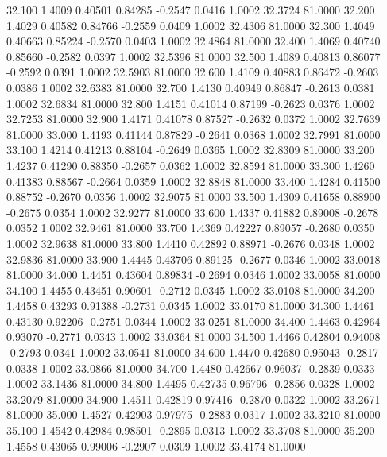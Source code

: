   32.100   1.4009   0.40501   0.84285  -0.2547   0.0416   1.0002  32.3724  81.0000
  32.200   1.4029   0.40582   0.84766  -0.2559   0.0409   1.0002  32.4306  81.0000
  32.300   1.4049   0.40663   0.85224  -0.2570   0.0403   1.0002  32.4864  81.0000
  32.400   1.4069   0.40740   0.85660  -0.2582   0.0397   1.0002  32.5396  81.0000
  32.500   1.4089   0.40813   0.86077  -0.2592   0.0391   1.0002  32.5903  81.0000
  32.600   1.4109   0.40883   0.86472  -0.2603   0.0386   1.0002  32.6383  81.0000
  32.700   1.4130   0.40949   0.86847  -0.2613   0.0381   1.0002  32.6834  81.0000
  32.800   1.4151   0.41014   0.87199  -0.2623   0.0376   1.0002  32.7253  81.0000
  32.900   1.4171   0.41078   0.87527  -0.2632   0.0372   1.0002  32.7639  81.0000
  33.000   1.4193   0.41144   0.87829  -0.2641   0.0368   1.0002  32.7991  81.0000
  33.100   1.4214   0.41213   0.88104  -0.2649   0.0365   1.0002  32.8309  81.0000
  33.200   1.4237   0.41290   0.88350  -0.2657   0.0362   1.0002  32.8594  81.0000
  33.300   1.4260   0.41383   0.88567  -0.2664   0.0359   1.0002  32.8848  81.0000
  33.400   1.4284   0.41500   0.88752  -0.2670   0.0356   1.0002  32.9075  81.0000
  33.500   1.4309   0.41658   0.88900  -0.2675   0.0354   1.0002  32.9277  81.0000
  33.600   1.4337   0.41882   0.89008  -0.2678   0.0352   1.0002  32.9461  81.0000
  33.700   1.4369   0.42227   0.89057  -0.2680   0.0350   1.0002  32.9638  81.0000
  33.800   1.4410   0.42892   0.88971  -0.2676   0.0348   1.0002  32.9836  81.0000
  33.900   1.4445   0.43706   0.89125  -0.2677   0.0346   1.0002  33.0018  81.0000
  34.000   1.4451   0.43604   0.89834  -0.2694   0.0346   1.0002  33.0058  81.0000
  34.100   1.4455   0.43451   0.90601  -0.2712   0.0345   1.0002  33.0108  81.0000
  34.200   1.4458   0.43293   0.91388  -0.2731   0.0345   1.0002  33.0170  81.0000
  34.300   1.4461   0.43130   0.92206  -0.2751   0.0344   1.0002  33.0251  81.0000
  34.400   1.4463   0.42964   0.93070  -0.2771   0.0343   1.0002  33.0364  81.0000
  34.500   1.4466   0.42804   0.94008  -0.2793   0.0341   1.0002  33.0541  81.0000
  34.600   1.4470   0.42680   0.95043  -0.2817   0.0338   1.0002  33.0866  81.0000
  34.700   1.4480   0.42667   0.96037  -0.2839   0.0333   1.0002  33.1436  81.0000
  34.800   1.4495   0.42735   0.96796  -0.2856   0.0328   1.0002  33.2079  81.0000
  34.900   1.4511   0.42819   0.97416  -0.2870   0.0322   1.0002  33.2671  81.0000
  35.000   1.4527   0.42903   0.97975  -0.2883   0.0317   1.0002  33.3210  81.0000
  35.100   1.4542   0.42984   0.98501  -0.2895   0.0313   1.0002  33.3708  81.0000
  35.200   1.4558   0.43065   0.99006  -0.2907   0.0309   1.0002  33.4174  81.0000

